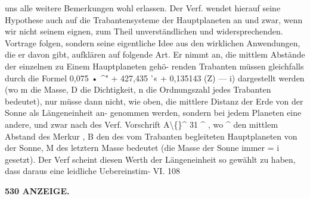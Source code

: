 \documentclass[12pt,a4paper]{article}
\begin{document}
uns alle  weitere  Bemerkungen  wohl  erlassen. Der  Verf.  wendet  hierauf  seine  Hypothese  auch  auf  die  Trabantensysteme  der  Hauptplaneten  an und  zwar,  wenn  wir  nicht  seinem  eignen,  zum  Theil  unverständlichen  und  widersprechenden.  Vortrage folgen,  sondern  seine  eigentliche  Idee  aus  den  wirklichen  Anwendungen,  die  er  davon  gibt,  aufklären auf  folgende  Art.  Er  nimmt  an,  die  mittlem  Abstände  der  einzelnen  zu  Einem  Hauptplaneten  gehö- renden Trabanten  müssen  gleichfalls  durch  die  Formel 0,075  •  \textasciicircum{}"  +  427,435 '«  +  0,135143  (Z)  ---  i) dargestellt  werden  (wo  m  die  Masse,  D  die  Dichtigkeit,  n  die  Ordnungszahl  jedes  Trabanten  bedeutet), nur  müsse  dann  nicht,   wie  oben,    die  mittlere  Distanz   der  Erde   von  der  Sonne   als  Längeneinheit  an- genommen  werden,    sondern    bei  jedem   Planeten   eine   andere,    und  zwar    nach   des   Verf.   Vorschrift A\textbackslash\{\}\textasciicircum{}  31 \textasciicircum{}     ,  wo  \textasciicircum{}  den  mittlem  Abstand  des  Merkur ,  B  den  des  vom  Trabanten  begleiteten  Hauptplaneten von  der  Sonne,   M  des  letztern  Masse  bedeutet  (die  Masse  der  Sonne  immer   =  i   gesetzt).     Der  Verf scheint  diesen  Werth  der  Längeneinheit  so  gewählt  zu  haben,  dass  daraus   eine  leidliche  Uebereinstim- VI. 108

\vspace{0.5em}


\noindent\textbf{530  ANZEIGE.}
\end{document}
